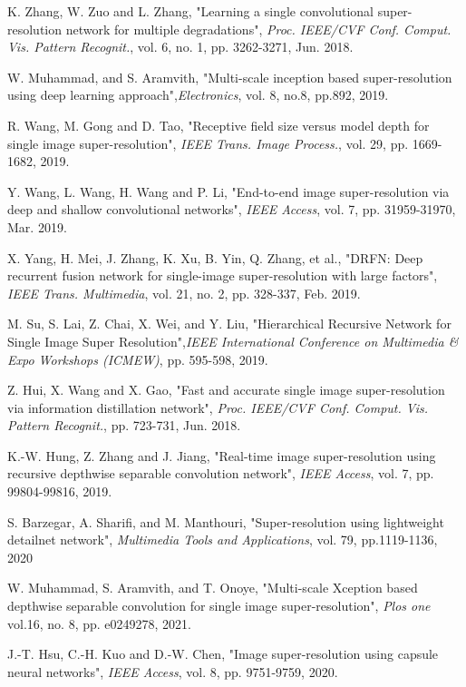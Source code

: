 \documentclass{ieeeaccess}
\begin{document}
\begin{thebibliography}{00}
 K. Zhang, W. Zuo and L. Zhang, "Learning a single convolutional super-resolution network for multiple degradations", \textit{Proc. IEEE/CVF Conf. Comput. Vis. Pattern Recognit.}, vol. 6, no. 1, pp. 3262-3271, Jun. 2018.


 W. Muhammad, and S. Aramvith, "Multi-scale inception based super-resolution using deep learning approach",\textit{Electronics}, vol. 8, no.8, pp.892, 2019.


R. Wang, M. Gong and D. Tao, "Receptive field size versus model depth for single image super-resolution", \textit{IEEE Trans. Image Process.}, vol. 29, pp. 1669-1682, 2019.


 Y. Wang, L. Wang, H. Wang and P. Li, "End-to-end image super-resolution via deep and shallow convolutional networks", \textit{IEEE Access}, vol. 7, pp. 31959-31970, Mar. 2019.


 X. Yang, H. Mei, J. Zhang, K. Xu, B. Yin, Q. Zhang, et al., "DRFN: Deep recurrent fusion network for single-image super-resolution with large factors", \textit{IEEE Trans. Multimedia}, vol. 21, no. 2, pp. 328-337, Feb. 2019.


 M. Su, S. Lai, Z. Chai, X. Wei, and Y. Liu, "Hierarchical Recursive Network for Single Image Super Resolution",\textit{IEEE International Conference on Multimedia \& Expo Workshops (ICMEW)}, pp. 595-598, 2019.


 Z. Hui, X. Wang and X. Gao, "Fast and accurate single image super-resolution via information distillation network", \textit{Proc. IEEE/CVF Conf. Comput. Vis. Pattern Recognit.}, pp. 723-731, Jun. 2018.


 K.-W. Hung, Z. Zhang and J. Jiang, "Real-time image super-resolution using recursive depthwise separable convolution network", \textit{IEEE Access}, vol. 7, pp. 99804-99816, 2019.



S. Barzegar, A. Sharifi, and M. Manthouri, "Super-resolution using lightweight detailnet network", \textit{Multimedia Tools and Applications}, vol. 79, pp.1119-1136, 2020


 W. Muhammad, S. Aramvith, and T. Onoye, "Multi-scale Xception based depthwise separable convolution for single image super-resolution", \textit{Plos one} vol.16, no. 8, pp. e0249278, 2021.



 J.-T. Hsu, C.-H. Kuo and D.-W. Chen, "Image super-resolution using capsule neural networks", \textit{IEEE Access}, vol. 8, pp. 9751-9759, 2020.




\end{thebibliography}
\end{document}
